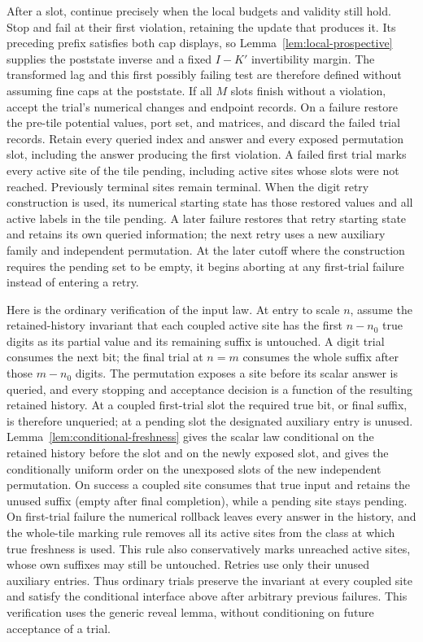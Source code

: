 After a slot, continue precisely when the local budgets and validity
still hold.  Stop and fail at their first violation, retaining
the update that produces it.  Its preceding prefix satisfies both cap
displays, so Lemma~\ref{lem:local-prospective} supplies the poststate
inverse and a fixed \(I-K'\) invertibility margin.  The transformed lag
and this first possibly failing test are therefore defined without
assuming fine caps at the poststate.
If all \(M\) slots finish without a
violation, accept the trial's numerical changes and endpoint records.
On a failure restore the pre-tile potential values, port set, and
matrices, and discard the failed trial records.  Retain every queried index and answer and
every exposed permutation slot, including the answer producing the
first violation.  A failed first trial marks every active site of the
tile pending, including active sites whose slots were not reached.
Previously terminal sites remain terminal.  When the digit retry
construction is used, its numerical starting state has those restored
values and all active labels in the tile pending.  A later failure
restores that retry starting state and retains its own queried
information; the next retry uses a new auxiliary family and independent
permutation.  At the later cutoff where the construction requires the
pending set to be empty, it begins aborting at any first-trial failure
instead of entering a retry.

Here is the ordinary verification of the input law.  At entry to scale
\(n\), assume the retained-history invariant that each coupled active
site has the first \(n-n_0\) true digits as its partial value and its
remaining suffix is untouched.  A digit trial consumes the next bit;
the final trial at \(n=m\) consumes the whole suffix after those
\(m-n_0\) digits.  The permutation exposes a site before its scalar
answer is queried, and every stopping and acceptance decision is a
function of the resulting retained history.  At a coupled first-trial
slot the required true bit, or final suffix, is therefore unqueried;
at a pending slot the designated auxiliary entry is unused.
Lemma~\ref{lem:conditional-freshness} gives the scalar law conditional
on the retained history before the slot and on the newly exposed slot,
and gives the conditionally uniform order on the unexposed slots of the
new independent permutation.  On success a coupled site consumes that true
input and retains the unused suffix (empty after final completion),
while a pending site stays
pending.  On first-trial failure the numerical rollback leaves every
answer in the history, and the whole-tile marking rule removes all its
active sites from the class at which true freshness is used.  This rule
also conservatively marks unreached active sites, whose own suffixes may
still be untouched.  Retries use only their unused auxiliary entries.
Thus ordinary trials preserve the invariant at every coupled site and
satisfy the conditional interface above after arbitrary previous
failures.  This verification uses the generic reveal lemma, without
conditioning on future acceptance of a trial.

